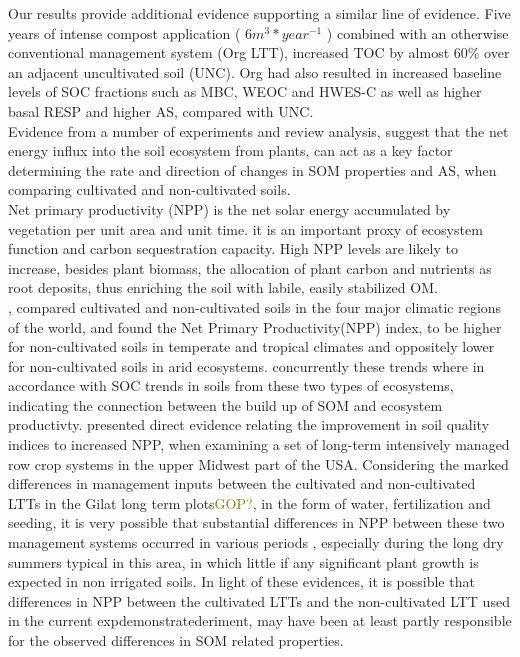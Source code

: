 \documentclass[12pt]{report}
\newcommand{\myGreen}[1]{\textcolor{olive}{#1}} %
\begin{document}
Our results provide additional evidence supporting a similar line of evidence. Five years of intense compost application ( $ 6 m^3*year^{-1} $ ) combined with an otherwise conventional management system (Org LTT), increased TOC by almost 60\% over an adjacent uncultivated soil (UNC). Org had also resulted in increased baseline levels of SOC fractions such as MBC, WEOC  and HWES-C  as well as higher basal RESP and higher AS, compared with UNC. \\
Evidence from a number of experiments and review analysis, suggest that the net energy influx into the soil ecosystem from plants, can act as a key factor determining the rate and direction of changes in SOM properties  and AS, when comparing cultivated and non-cultivated soils. \\
Net primary productivity (NPP) is the net solar energy accumulated by vegetation per unit area and unit time. it is an important proxy of ecosystem function and carbon sequestration capacity\citep{jackson2016}. High NPP levels are likely to increase, besides plant biomass, the allocation of plant carbon and nutrients as root deposits, thus enriching the soil with labile, easily stabilized OM.  \\
\citeauthor{trivedi2016}, compared cultivated and non-cultivated soils in the four major climatic regions of the world, and found the Net Primary Productivity(NPP) index, to be higher for non-cultivated soils in temperate and tropical climates and oppositely lower for non-cultivated soils in arid ecosystems. concurrently these trends where in accordance with SOC trends in soils from these two types of ecosystems, indicating the connection between the build up of SOM  and ecosystem productivty. \citet{bhardwaj2011} presented direct evidence relating the improvement in soil quality indices to increased NPP, when examining a set of long-term intensively managed row crop systems in the upper Midwest part of the USA.
Considering the marked differences in management inputs between the cultivated and non-cultivated LTTs in the Gilat long term plots\myGreen{GOP?}, in the form of water, fertilization and seeding, it is very possible that substantial differences in NPP between these two management systems occurred in various periods , especially during the long dry summers typical in this area, in which little  if any significant plant growth is expected in non irrigated soils. 
In light of these evidences, it is possible that differences in NPP between the cultivated LTTs and the non-cultivated LTT used in the current expdemonstratederiment, may have been at least partly responsible for the observed differences in SOM related properties.
\end{document}
